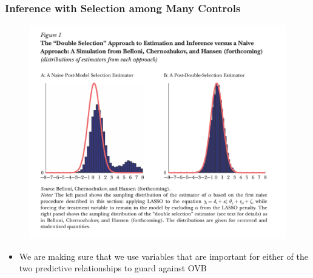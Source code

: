 \documentclass[
  shownotes,
  xcolor={svgnames},
  hyperref={colorlinks,citecolor=DarkBlue,linkcolor=DarkRed,urlcolor=DarkBlue}
  , aspectratio=169]{beamer}
\begin{document}
\begin{frame}[fragile]
\frametitle{Inference with Selection among Many Controls}


   \begin{figure}[H] \centering
            \captionsetup{justification=centering}
              \includegraphics[scale=0.30]{figures/fig1_belloni}
 \end{figure}

\begin{itemize}
\item We are making sure that we use variables that are important for either of the two predictive relationships to guard against OVB
\end{itemize}
\end{frame}
\end{document}

